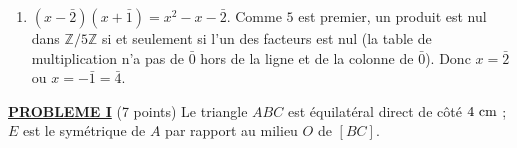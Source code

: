 \begin{description}
\begin{enumerate}
\begin{enumerate}
			\item {}
				$(x - \bar{2})(x + \bar{1}) = x^2 - x - \bar{2}$. Comme $5$ est premier, un produit est nul dans $\mathbb{Z}/5\mathbb{Z}$ si et seulement si l'un des facteurs est nul
				(la table de multiplication n'a pas de $\bar{0}$ hors de la ligne et de la colonne de $\bar{0}$).
				Donc $x = \bar{2}$ ou $x = -\bar{1} = \bar{4}$. \par\noindent{}
		\end{enumerate}
	\end{enumerate}
\end{description}
\noindent \underline{\textsc{\textbf{PROBLEME I}}} (7 points) \newline
Le triangle $ABC$ est équilatéral direct de côté $4~\mathrm{cm}$ ; $E$ est le symétrique de $A$ par rapport au milieu $O$ de $[BC]$.
